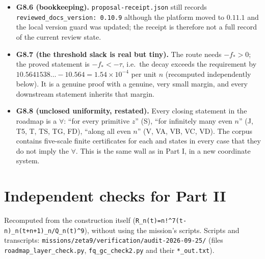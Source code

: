 \documentclass[11pt]{article}
\begin{document}
\begin{itemize}[leftmargin=1.4em]
      $\Rightarrow$ R'') are real reductions. The prose is right; the edge types are not, and an
      undeclared node id (\texttt{TC}) appears once as a source. Purely presentational, but a reader
      who reads the graph alone would over-count the reductions.
\item \textbf{G8.6 (bookkeeping).} \texttt{proposal-receipt.json} still records
      \texttt{reviewed\_docs\_version: 0.10.9} although the platform moved to $0.11.1$ and the local
      version guard was updated; the receipt is therefore not a full record of the current review
      state.
\item \textbf{G8.7 (the threshold slack is real but tiny).} The route needs $-f_*>0$; the proved
      statement is $-f_*<-\tau$, i.e.\ the decay exceeds the requirement by
      $10.5641538\ldots-10.564=1.54\times10^{-4}$ per unit $n$ (recomputed independently below). It
      is a genuine proof with a genuine, very small margin, and every downstream statement inherits
      that margin.
\item \textbf{G8.8 (unclosed uniformity, restated).} Every closing statement in the roadmap is a
      $\forall$: ``for every primitive $z$'' (S), ``for infinitely many even $n$'' (J, T5, T, TS, TG,
      FD), ``along all even $n$'' (V, VA, VB, VC, VD). The corpus contains five-scale finite
      certificates for each and states in every case that they do not imply the $\forall$. This is
      the same wall as in Part I, in a new coordinate system.
\end{itemize}

\section{Independent checks for Part II}
\label{sec:checks2}

Recomputed from the construction itself (\texttt{R\_n(t)=n!^7(t-n)\_n(t+n+1)\_n/Q\_n(t)^9}), without
using the mission's scripts. Scripts and transcripts:
\texttt{missions/zeta9/verification/audit-2026-09-25/} (files \texttt{roadmap\_layer\_check.py},
\texttt{fq\_gc\_check2.py} and their \texttt{*\_out.txt}).
\end{document}
